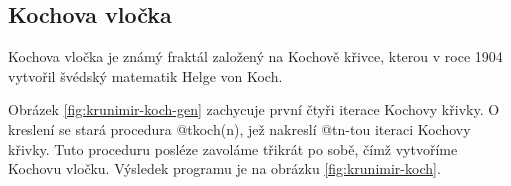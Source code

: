\subsection{Kochova vločka}

Kochova vločka je známý fraktál založený na Kochově křivce, kterou v roce 1904
vytvořil švédský matematik Helge von Koch. \cite{wiki:koch-snowflake}

Obrázek \ref{fig:krunimir-koch-gen} zachycuje první čtyři iterace Kochovy
křivky. O kreslení se stará procedura @t{koch(n)}, jež nakreslí @t{n}-tou
iteraci Kochovy křivky. Tuto proceduru posléze zavoláme třikrát po sobě, čímž
vytvoříme Kochovu vločku. Výsledek programu je na obrázku
\ref{fig:krunimir-koch}.



